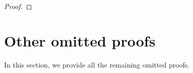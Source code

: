 \begin{proof}

\end{proof}

\section{Other omitted proofs}\label{sec:other_proofs}

In this section, we provide all the remaining omitted proofs.





